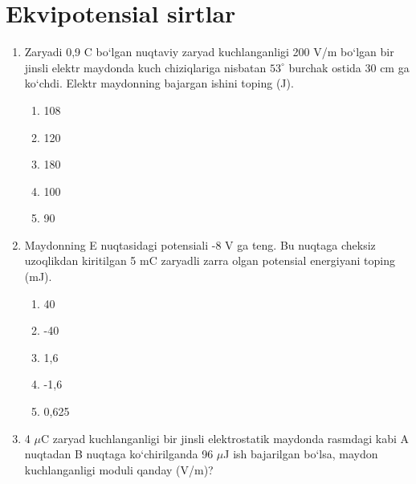 \section{Ekvipotensial sirtlar}

\begin{enumerate}

    \item Zaryadi 0,9 C bo‘lgan nuqtaviy zaryad kuchlanganligi 200 V/m bo‘lgan bir jinsli elektr maydonda kuch chiziqlariga nisbatan $53^\circ$ burchak ostida 30 cm ga ko‘chdi. Elektr maydonning bajargan ishini toping (J).
    \begin{enumerate}[label=\Alph*)]
        \item 108
        \item 120
        \item 180
        \item 100
        \item 90
    \end{enumerate}

    \item Maydonning E nuqtasidagi potensiali -8 V ga teng. Bu nuqtaga cheksiz uzoqlikdan kiritilgan 5 mC zaryadli zarra olgan potensial energiyani toping (mJ).
    \begin{enumerate}[label=\Alph*)]
        \item 40
        \item -40
        \item 1,6
        \item -1,6
        \item 0,625
    \end{enumerate}

    \item 4 $\mu$C zaryad kuchlanganligi bir jinsli elektrostatik maydonda rasmdagi kabi A nuqtadan B nuqtaga ko‘chirilganda 96 $\mu$J ish bajarilgan bo‘lsa, maydon kuchlanganligi moduli qanday (V/m)?

\end{enumerate}
